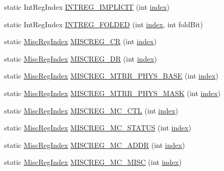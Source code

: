 \begin{DoxyCompactItemize}
\item 
static IntRegIndex \hyperlink{namespaceX86ISA_a6920fb8f756a52ab3ff6b34df60f836c}{INTREG\_\-IMPLICIT} (int \hyperlink{namespaceX86ISA_aa7f971ede8ba06dbd8a605007eda1c6f}{index})
\item 
static IntRegIndex \hyperlink{namespaceX86ISA_a747f6995af14f9cf225a0a9385d157f4}{INTREG\_\-FOLDED} (int \hyperlink{namespaceX86ISA_aa7f971ede8ba06dbd8a605007eda1c6f}{index}, int foldBit)
\item 
static \hyperlink{namespaceX86ISA_a1e522017e015d4c7efd6b2360143aa67}{MiscRegIndex} \hyperlink{namespaceX86ISA_a1d9390d2a9b1492e2f14c97e2db2ceed}{MISCREG\_\-CR} (int \hyperlink{namespaceX86ISA_aa7f971ede8ba06dbd8a605007eda1c6f}{index})
\item 
static \hyperlink{namespaceX86ISA_a1e522017e015d4c7efd6b2360143aa67}{MiscRegIndex} \hyperlink{namespaceX86ISA_ac1e3294c84d21bbaf4bd955237fd8e19}{MISCREG\_\-DR} (int \hyperlink{namespaceX86ISA_aa7f971ede8ba06dbd8a605007eda1c6f}{index})
\item 
static \hyperlink{namespaceX86ISA_a1e522017e015d4c7efd6b2360143aa67}{MiscRegIndex} \hyperlink{namespaceX86ISA_a4376444d0ecbbff164d82b2e8a65471c}{MISCREG\_\-MTRR\_\-PHYS\_\-BASE} (int \hyperlink{namespaceX86ISA_aa7f971ede8ba06dbd8a605007eda1c6f}{index})
\item 
static \hyperlink{namespaceX86ISA_a1e522017e015d4c7efd6b2360143aa67}{MiscRegIndex} \hyperlink{namespaceX86ISA_a181eaf0dd78921a606c1727c0ea17e0d}{MISCREG\_\-MTRR\_\-PHYS\_\-MASK} (int \hyperlink{namespaceX86ISA_aa7f971ede8ba06dbd8a605007eda1c6f}{index})
\item 
static \hyperlink{namespaceX86ISA_a1e522017e015d4c7efd6b2360143aa67}{MiscRegIndex} \hyperlink{namespaceX86ISA_ada6bc06a550215bc7c4b09d9d1f747e5}{MISCREG\_\-MC\_\-CTL} (int \hyperlink{namespaceX86ISA_aa7f971ede8ba06dbd8a605007eda1c6f}{index})
\item 
static \hyperlink{namespaceX86ISA_a1e522017e015d4c7efd6b2360143aa67}{MiscRegIndex} \hyperlink{namespaceX86ISA_a788a5d14812b79f5e74448195f953858}{MISCREG\_\-MC\_\-STATUS} (int \hyperlink{namespaceX86ISA_aa7f971ede8ba06dbd8a605007eda1c6f}{index})
\item 
static \hyperlink{namespaceX86ISA_a1e522017e015d4c7efd6b2360143aa67}{MiscRegIndex} \hyperlink{namespaceX86ISA_aec4e5e9a0054e6f569f57a147949262d}{MISCREG\_\-MC\_\-ADDR} (int \hyperlink{namespaceX86ISA_aa7f971ede8ba06dbd8a605007eda1c6f}{index})
\item 
static \hyperlink{namespaceX86ISA_a1e522017e015d4c7efd6b2360143aa67}{MiscRegIndex} \hyperlink{namespaceX86ISA_a50504e1ffcb068568a0d815d5e2c3c48}{MISCREG\_\-MC\_\-MISC} (int \hyperlink{namespaceX86ISA_aa7f971ede8ba06dbd8a605007eda1c6f}{index})

\end{DoxyCompactItemize}
